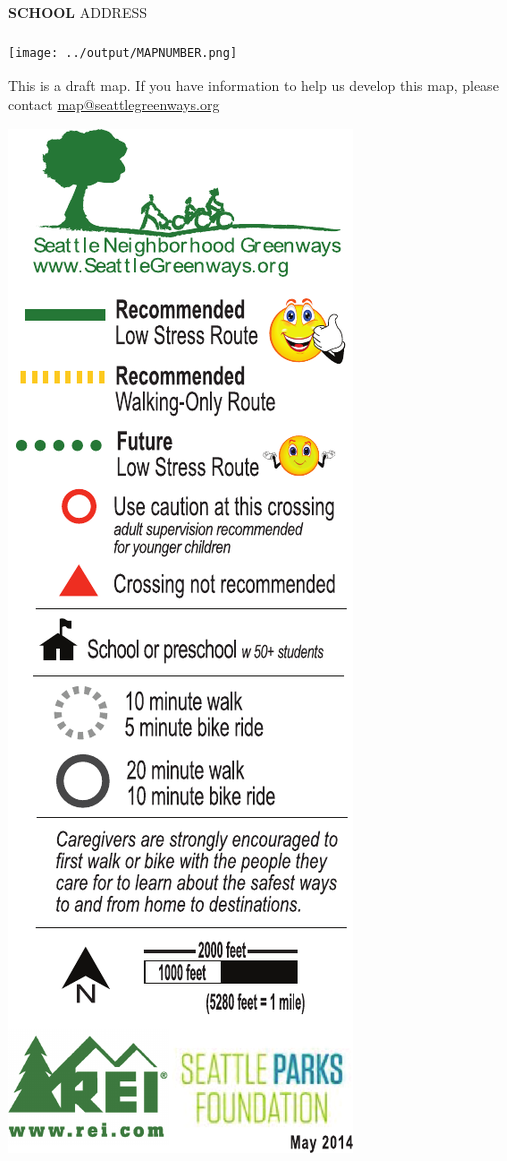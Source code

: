\clearpage
\begin{minipage}{.69\textwidth}
\hspace{.05in}\Large\textbf{SCHOOL}\hfill
\hfill ADDRESS \hspace{.01in} \\
\vspace{-4mm} \\
\texttt{[image: ../output/MAPNUMBER.png]} \\
\scriptsize
\centerline{
This is a draft map. If you have information to help us develop this map, please contact \href{mailto:map@seattlegreenways.org}{map@seattlegreenways.org}}
\normalsize
\end{minipage}
\begin{minipage}{.29\textwidth}
\includegraphics[height=\textheight]{../src/legend.pdf}
\end{minipage}
